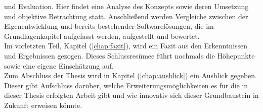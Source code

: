     und Evaluation. Hier findet eine Analyse des Konzepts sowie deren Umsetzung und objektive Betrachtung statt. Anschließend werden 
    Vergleiche zwischen der Eigenentwicklung und bereits bestehender Softwarelösungen, die im Grundlagenkapitel aufgefasst werden, 
    aufgestellt und bewertet. %
    \\
    \linebreak
    Im vorletzten Teil, Kapitel (\ref{chap:fazit}), wird ein Fazit aus den Erkenntnissen und Ergebnissen gezogen. Dieses Schlussresümee 
    führt nochmals die Höhepunkte sowie eine eigene Einschätzung auf. 
    \\
    \linebreak
    Zum Abschluss der Thesis wird in Kapitel (\ref{chap:ausblick}) ein Ausblick gegeben. Dieser gibt Aufschluss darüber, welche 
    Erweiterungsmöglichkeiten es für die in dieser Thesis erfolgten Arbeit gibt und wie innovativ sich dieser Grundbaustein in Zukunft 
    erweisen könnte. 

